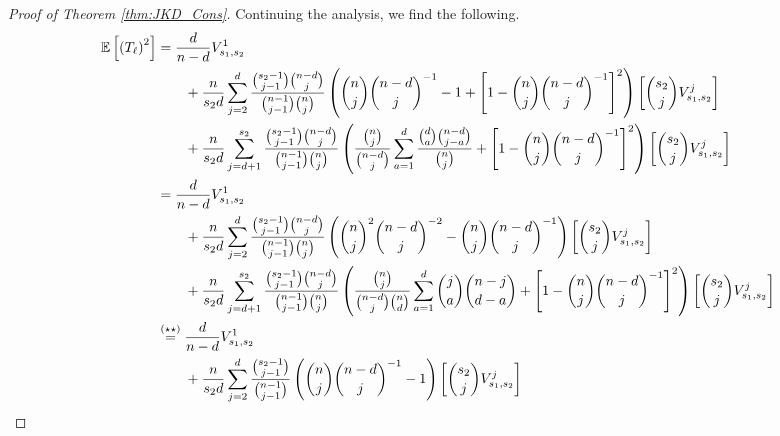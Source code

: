 \begin{proof}[Proof of Theorem \ref{thm:JKD_Cons}]
	Continuing the analysis, we find the following.
	\begin{equation}
		\begin{aligned}
			\E\left[\left(T_{\ell}\right)^2\right]
			 & = \frac{d}{n - d} V_{s_1, s_2}^{1}                                                                                                                        \\
			 & \quad \quad + \frac{n}{s_2 d}\sum_{j = 2}^{d}\frac{\binom{s_2 - 1}{j - 1}\binom{n - d}{j}}{\binom{n - 1}{j - 1}\binom{n}{j}}
			\left(\binom{n}{j}\binom{n - d}{j}^{-1} - 1
			+ \left[1 - \binom{n}{j}\binom{n-d}{j}^{-1}\right]^{2} \right)\left[\binom{s_2}{j}V_{s_1, s_2}^{j}\right]                                                    \\
			 & \quad \quad + \frac{n}{s_2 d}\sum_{j = d + 1}^{s_2}\frac{\binom{s_2 - 1}{j - 1}\binom{n - d}{j}}{\binom{n - 1}{j - 1}\binom{n}{j}}
			\left(\frac{\binom{n}{j}}{\binom{n - d}{j}}\sum_{a = 1}^{d}\frac{\binom{d}{a}\binom{n - d}{j - a}}{\binom{n}{j}}
			+ \left[1 - \binom{n}{j}\binom{n-d}{j}^{-1}\right]^{2}\right)\left[\binom{s_2}{j}V_{s_1, s_2}^{j}\right]                                                     \\
			 & = \frac{d}{n - d} V_{s_1, s_2}^{1}                                                                                                                        \\
			 & \quad \quad + \frac{n}{s_2 d}\sum_{j = 2}^{d}\frac{\binom{s_2 - 1}{j - 1}\binom{n - d}{j}}{\binom{n - 1}{j - 1}\binom{n}{j}}
			\left(\binom{n}{j}^{2}\binom{n-d}{j}^{-2} - \binom{n}{j}\binom{n-d}{j}^{-1}\right)\left[\binom{s_2}{j}V_{s_1, s_2}^{j}\right]                                \\
			 & \quad \quad + \frac{n}{s_2 d}\sum_{j = d + 1}^{s_2}\frac{\binom{s_2 - 1}{j - 1}\binom{n - d}{j}}{\binom{n - 1}{j - 1}\binom{n}{j}}
			\left(\frac{\binom{n}{j}}{\binom{n - d}{j}\binom{n}{d}}\sum_{a = 1}^{d}\binom{j}{a}\binom{n - j}{d - a}
			+ \left[1 - \binom{n}{j}\binom{n-d}{j}^{-1}\right]^{2}\right)\left[\binom{s_2}{j}V_{s_1, s_2}^{j}\right]                                                     \\
			 & \overset{(\star\star)}{=} \frac{d}{n - d} V_{s_1, s_2}^{1}                                                                                                \\
			 & \quad \quad + \frac{n}{s_2 d}\sum_{j = 2}^{d}\frac{\binom{s_2 - 1}{j - 1}}{\binom{n - 1}{j - 1}}
			\left(\binom{n}{j}\binom{n-d}{j}^{-1} - 1\right)\left[\binom{s_2}{j}V_{s_1, s_2}^{j}\right]                                                                  \\

\end{aligned}
\end{equation}
\end{proof}

